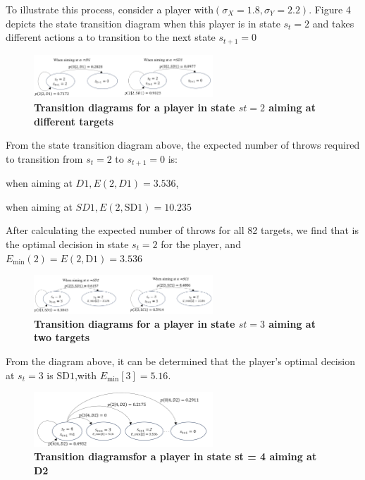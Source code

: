 \documentclass[cjjs]{ipart}
\theoremstyle{plain}
\begin{document}
To illustrate this process, consider a player with$(\sigma_X = 1.8, \sigma_Y = 2.2)$. Figure 4 depicts the state transition diagram when this player is in state $s_t = 2$ and takes different actions a to transition to the next state $s_{t+1} = 0$

\begin{figure}[h]
    \centering
    \includegraphics[width=0.60\textwidth]{6.png} 
    \caption{\textbf{Transition diagrams
for a player in state $st = 2$ aiming at different targets}}
    \label{fig:dartboard}
\end{figure}

From the state transition diagram above, the expected number of throws required to transition from $s_t = 2$ to $s_{t+1} =0$ is:

when aiming at $D1,E(2, D1) = 3.536$,

when aiming at $SD1,E(2, \text{SD1}) = 10.235$

After calculating the expected number of throws for all 82 targets, we find that is the optimal decision in state $s_t = 2$ for the player, and $E_{\min}(2) = E(2, \text{D1}) = 3.536$

\begin{figure}[h]
    \centering
    \includegraphics[width=0.60\textwidth]{7.png} 
    \caption{\textbf{Transition diagrams
for a player in state $st = 3$ aiming at two targets}}
    \label{fig:dartboard}
\end{figure}

From the diagram above, it can be determined that the player's optimal decision at $s_t = 3$ is $\text{SD1}$,with $E_{\min}[3] = 5.16$.

\begin{figure}[h]
    \centering
    \includegraphics[width=0.60\textwidth]{8.png} 
    \caption{\textbf{Transition diagramsfor a player in state st = 4 aiming at D2}}
    \label{fig:dartboard}
\end{figure}
\end{document}
